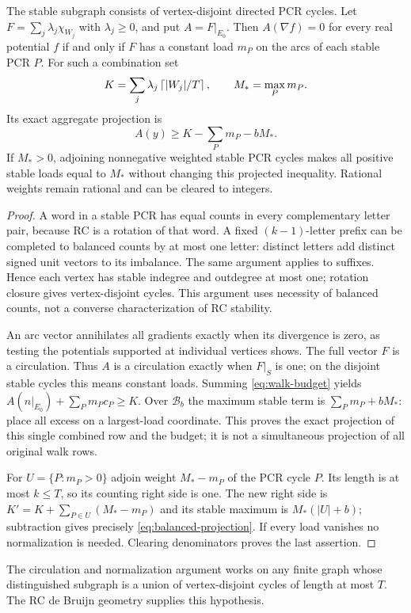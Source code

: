 \begin{proposition}
\label{prop:balanced-normal-form}
The stable subgraph consists of vertex-disjoint directed PCR cycles.
Let $F=\sum_j\lambda_j\chi_{W_j}$ with $\lambda_j\ge0$, and put $A=F|_{E_0}$.
Then $A(\nabla f)=0$ for every real potential $f$ if and only if $F$ has a
constant load $m_P$ on the arcs of each stable PCR $P$.
For such a combination set
\[
 K=\sum_j\lambda_j\left\lceil|W_j|/T\right\rceil,\qquad M_* =\max_Pm_P.
\]
Its exact aggregate projection is
\begin{equation}
 A(y)\ge K-\sum_Pm_P-bM_* .\label{eq:balanced-projection}
\end{equation}
If $M_*>0$, adjoining nonnegative weighted stable PCR cycles makes all
positive stable loads equal to $M_*$ without changing this projected
inequality. Rational weights remain rational and can be cleared to integers.
\end{proposition}
\begin{proof}
A word in a stable PCR has equal counts in every complementary letter pair,
because RC is a rotation of that word. A fixed $(k-1)$-letter prefix can be
completed to balanced counts by at most one letter: distinct letters add
distinct signed unit vectors to its imbalance. The same argument applies to
suffixes. Hence each vertex has stable indegree and outdegree at most one;
rotation closure gives vertex-disjoint cycles. This argument uses necessity
of balanced counts, not a converse characterization of RC stability.

An arc vector annihilates all gradients exactly when its divergence is zero,
as testing the potentials supported at individual vertices shows. The full
vector $F$ is a circulation. Thus $A$ is a circulation exactly when $F|_S$
is one; on the disjoint stable cycles this means constant loads.
Summing \eqref{eq:walk-budget} yields
$A(n|_{E_0})+\sum_Pm_Pc_P\ge K$. Over $\mathcal B_b$ the maximum stable
term is $\sum_Pm_P+bM_*$: place all excess on a largest-load coordinate.
This proves the exact projection of this single combined row and the budget;
it is not a simultaneous projection of all original walk rows.

For $U=\{P:m_P>0\}$ adjoin weight $M_*-m_P$ of the PCR cycle $P$.
Its length is at most $k\le T$, so its counting right side is one.
The new right side is $K'=K+\sum_{P\in U}(M_*-m_P)$ and its stable maximum
is $M_*(|U|+b)$; subtraction gives precisely \eqref{eq:balanced-projection}.
If every load vanishes no normalization is needed. Clearing denominators
proves the last assertion.
\end{proof}
The circulation and normalization argument works on any finite graph whose
distinguished subgraph is a union of vertex-disjoint cycles of length at most
$T$. The RC de Bruijn geometry supplies this hypothesis.

